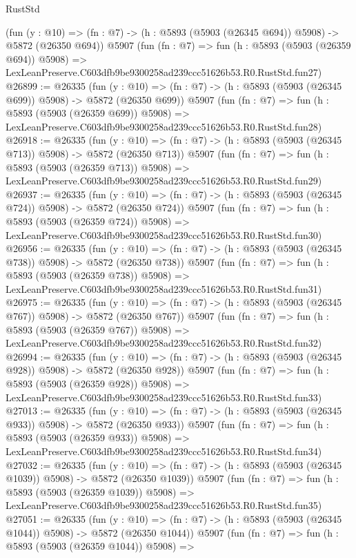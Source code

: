 \begin{lexlean}{RustStd}
\begin{coremodule}
    (fun (y : @10) => (fn : @7) -> (h : @5893 (@5903 (@26345 @694)) @5908) -> @5872 (@26350 @694))
    @5907
    (fun (fn : @7) =>
    fun (h : @5893 (@5903 (@26359 @694)) @5908) =>
    LexLeanPreserve.C603dfb9be9300258ad239ccc51626b53.R0.RustStd.fun27)
@26899 := @26335
    (fun (y : @10) => (fn : @7) -> (h : @5893 (@5903 (@26345 @699)) @5908) -> @5872 (@26350 @699))
    @5907
    (fun (fn : @7) =>
    fun (h : @5893 (@5903 (@26359 @699)) @5908) =>
    LexLeanPreserve.C603dfb9be9300258ad239ccc51626b53.R0.RustStd.fun28)
@26918 := @26335
    (fun (y : @10) => (fn : @7) -> (h : @5893 (@5903 (@26345 @713)) @5908) -> @5872 (@26350 @713))
    @5907
    (fun (fn : @7) =>
    fun (h : @5893 (@5903 (@26359 @713)) @5908) =>
    LexLeanPreserve.C603dfb9be9300258ad239ccc51626b53.R0.RustStd.fun29)
@26937 := @26335
    (fun (y : @10) => (fn : @7) -> (h : @5893 (@5903 (@26345 @724)) @5908) -> @5872 (@26350 @724))
    @5907
    (fun (fn : @7) =>
    fun (h : @5893 (@5903 (@26359 @724)) @5908) =>
    LexLeanPreserve.C603dfb9be9300258ad239ccc51626b53.R0.RustStd.fun30)
@26956 := @26335
    (fun (y : @10) => (fn : @7) -> (h : @5893 (@5903 (@26345 @738)) @5908) -> @5872 (@26350 @738))
    @5907
    (fun (fn : @7) =>
    fun (h : @5893 (@5903 (@26359 @738)) @5908) =>
    LexLeanPreserve.C603dfb9be9300258ad239ccc51626b53.R0.RustStd.fun31)
@26975 := @26335
    (fun (y : @10) => (fn : @7) -> (h : @5893 (@5903 (@26345 @767)) @5908) -> @5872 (@26350 @767))
    @5907
    (fun (fn : @7) =>
    fun (h : @5893 (@5903 (@26359 @767)) @5908) =>
    LexLeanPreserve.C603dfb9be9300258ad239ccc51626b53.R0.RustStd.fun32)
@26994 := @26335
    (fun (y : @10) => (fn : @7) -> (h : @5893 (@5903 (@26345 @928)) @5908) -> @5872 (@26350 @928))
    @5907
    (fun (fn : @7) =>
    fun (h : @5893 (@5903 (@26359 @928)) @5908) =>
    LexLeanPreserve.C603dfb9be9300258ad239ccc51626b53.R0.RustStd.fun33)
@27013 := @26335
    (fun (y : @10) => (fn : @7) -> (h : @5893 (@5903 (@26345 @933)) @5908) -> @5872 (@26350 @933))
    @5907
    (fun (fn : @7) =>
    fun (h : @5893 (@5903 (@26359 @933)) @5908) =>
    LexLeanPreserve.C603dfb9be9300258ad239ccc51626b53.R0.RustStd.fun34)
@27032 := @26335
    (fun (y : @10) => (fn : @7) -> (h : @5893 (@5903 (@26345 @1039)) @5908) -> @5872 (@26350 @1039))
    @5907
    (fun (fn : @7) =>
    fun (h : @5893 (@5903 (@26359 @1039)) @5908) =>
    LexLeanPreserve.C603dfb9be9300258ad239ccc51626b53.R0.RustStd.fun35)
@27051 := @26335
    (fun (y : @10) => (fn : @7) -> (h : @5893 (@5903 (@26345 @1044)) @5908) -> @5872 (@26350 @1044))
    @5907
    (fun (fn : @7) =>
    fun (h : @5893 (@5903 (@26359 @1044)) @5908) =>

\end{coremodule}
\end{lexlean}
